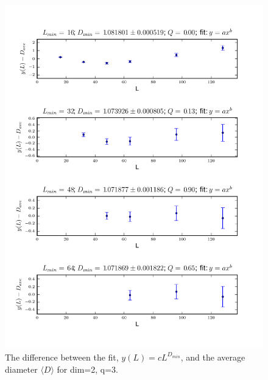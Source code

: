 \documentclass[pre,preprint]{revtex4}
\newcommand{\lb}{{\langle}}
\newcommand{\rb}{{\rangle}}
\begin{document}
\begin{figure}[htp]
\centering
\includegraphics[width=.85\textwidth]{figures/D_min_D2q3_46_fig}
\caption{The difference between the fit, $y(L)=cL^{D_{min}}$, and the average diameter $\lb D \rb$ for dim=2, q=3.}\label{fig:4}
\end{figure}

\end{document}
